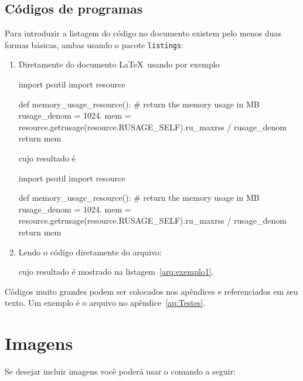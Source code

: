 \documentclass[12pt,a4paper,twoside]{report}
\begin{document}
\section{Códigos de programas}
Para introduzir a listagem do código no documento existem pelo menos duas
formas básicas, ambas usando o pacote \verb|listings|:
\begin{enumerate}
\item Diretamente do documento \LaTeX\ usando por exemplo
\begin{latex}
\begin{python}
import psutil
import resource


def memory_usage_resource():
    # return the memory usage in MB
    rusage_denom = 1024.
    mem = resource.getrusage(resource.RUSAGE_SELF).ru_maxrss / rusage_denom
    return mem

\end{python}
\end{latex}
cujo resultado é
\begin{python}
import psutil
import resource


def memory_usage_resource():
    # return the memory usage in MB
    rusage_denom = 1024.
    mem = resource.getrusage(resource.RUSAGE_SELF).ru_maxrss / rusage_denom
    return mem

\end{python}  
\item Lendo o código diretamente do arquivo:
\begin{latex}

\end{latex}
cujo resultado é mostrado na listagem~\ref{arq:exemplo1}.


\end{enumerate}

Códigos muito grandes podem ser colocados nos apêndices e referenciados em
seu texto. Um exemplo é o arquivo no apêndice~\ref{ap:Testes}.
\chapter{Imagens}

Se desejar incluir imagens você poderá usar o comando a seguir:
\end{document}
